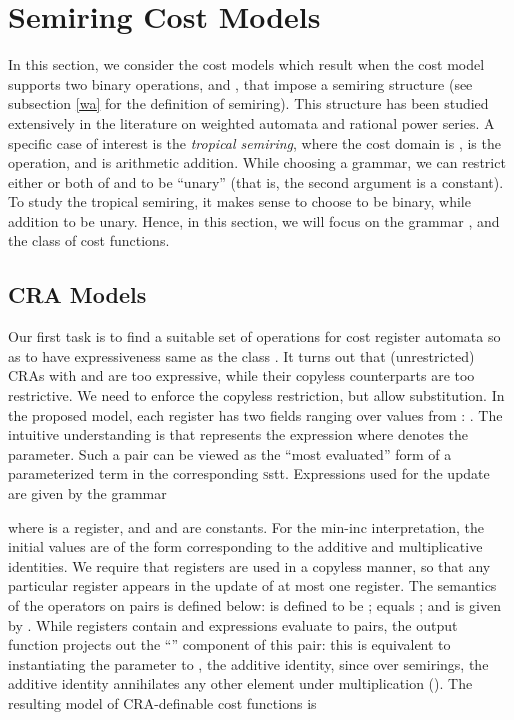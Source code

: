 \documentclass[11pt]{article}
\newcommand{\mypar}[1]{\subsection{#1}}
\newcommand{\SSTT}{{\sc\textsc sstt}\xspace}
\begin{document}
\section{Semiring Cost Models}\label{sec:scm}


In this section, we consider the cost models which result when the
cost model supports two binary operations,
 and , that impose a semiring structure (see subsection \ref{wa} for the definition of semiring).
This structure has been studied extensively in the literature on weighted automata and rational power series.
A specific case of interest is the {\em tropical semiring\/},
where the cost domain is ,  is the  operation, and  is arithmetic addition.
While choosing a grammar, we can restrict either or both of  and  to be ``unary''
(that is, the second argument is a constant).
To study the tropical semiring, it makes sense to choose  to be binary, while
addition to be unary. Hence, in this section, we will focus on the grammar ,
and the class  of cost functions.

\mypar{CRA Models}
Our first task is to find a suitable set of operations for cost register automata so as
to have expressiveness same as the class  .
It turns out that (unrestricted) CRAs with  and  are too expressive,
while their copyless counterparts are too restrictive.
We need to enforce the copyless restriction, but allow substitution.
In the proposed model, each register 
has two fields ranging over values from : .
The intuitive understanding is that  represents the expression
 where  denotes the parameter.
Such a pair can be viewed as the ``most evaluated'' form
of a parameterized term in the corresponding \SSTT.
Expressions used for the update are given by the grammar

where  is a register, and  and  are constants.
For the min-inc interpretation, the initial values are of the form
 corresponding to the additive
and multiplicative identities.
We require that registers are used in a copyless manner, so that any
particular register  appears in the update of at most one register.
The semantics of the operators on pairs is defined below:
 is defined to be  ;
 equals ; and
 is given by .
While registers contain and expressions evaluate to pairs, the output function projects out
the ``'' component of this pair: this is equivalent to instantiating the parameter  to , the additive
identity, since over semirings, the additive identity annihilates any other element under multiplication
().
The resulting model of CRA-definable cost functions is
\end{document}
